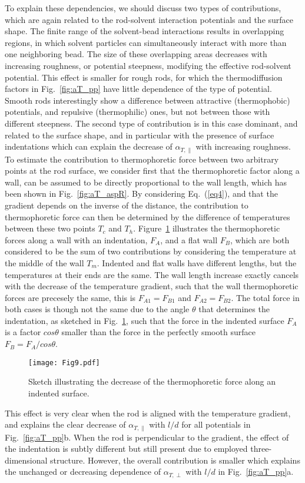 \documentclass[aps,pre,twocolumn,showpacs,superscriptaddress]{revtex4-1}
\begin{document}
To explain these dependencies, we should discuss two types of
contributions, which are again related to the rod-solvent interaction
potentials and the surface shape. The finite range of the solvent-bead
interactions results in overlapping regions, in which solvent
particles can simultaneously interact with more than one neighboring
bead. The size of these overlapping areas decreases with increasing
roughness, or potential steepness, modifying the effective rod-solvent
potential. This effect is smaller for rough rods, for which the
thermodiffusion factors in Fig.~\ref{fig:aT_pp} have little dependence
of the type of potential. Smooth rods interestingly show a difference
between attractive (thermophobic) potentials, and repulsive
(thermophilic) ones, but not between those with different
steepness. The second type of contribution is in this case dominant,
and related to the surface shape, and in particular with the presence
of surface indentations which can explain the decrease of
$\alpha_{T,\|}$ with increasing roughness. To estimate the
contribution to thermophoretic force between two arbitrary points at
the rod surface, we consider first that the thermophoretic factor
along a wall, can be assumed to be directly proportional to the wall
length, which has been shown in Fig.~\ref{fig:aT_aspR}.  By
considering Eq.~(\ref{eq4}), and that the gradient depends on the
inverse of the distance, the contribution to thermophoretic force can
then be determined by the difference of temperatures between these two
points $T_c$ and $T_h$.  Figure~\ref{fig:indent} illustrates the
thermophoretic forces along a wall with an indentation, $F_A$, and a
flat wall $F_B$, which are both considered to be the sum of two
contributions by considering the temperature at the middle of the wall
$T_m$. Indented and flat walls have different lengths, but the
temperatures at their ends are the same. %
The wall length increase exactly cancels with the decrease of the
temperature gradient, such that the wall thermophoretic forces are
precesely the same, this is $F_{A1}=F_{B1}$ and $F_{A2}=F_{B2}$.
The total force in both cases is though not the same due to the angle
$\theta$ that determines the indentation, as sketched in
Fig.~\ref{fig:indent}, such that the force in the indented surface
$F_A$ is a factor $cos\theta$ smaller than the force in the perfectly
smooth surface $F_B= F_A/cos\theta$.
\begin{figure}[h!]
\texttt{[image: Fig9.pdf]}
\caption{Sketch illustrating the decrease of the thermophoretic 
     force along an indented surface.
  \label{fig:indent} }
\end{figure}
This effect is very clear when the rod is aligned with the temperature
gradient, and explains the clear decrease of $\alpha_{T,\|}$ with
$l/d$ for all potentials in Fig.~\ref{fig:aT_pp}b. When the rod
  is perpendicular to the gradient, the effect of the indentation is
  subtly different but still present due to employed three-dimensional
  structure. However, the overall contribution is smaller which explains
  the unchanged or decreasing dependence of $\alpha_{T,\perp}$ with
  $l/d$ in Fig.~\ref{fig:aT_pp}a.
\end{document}
